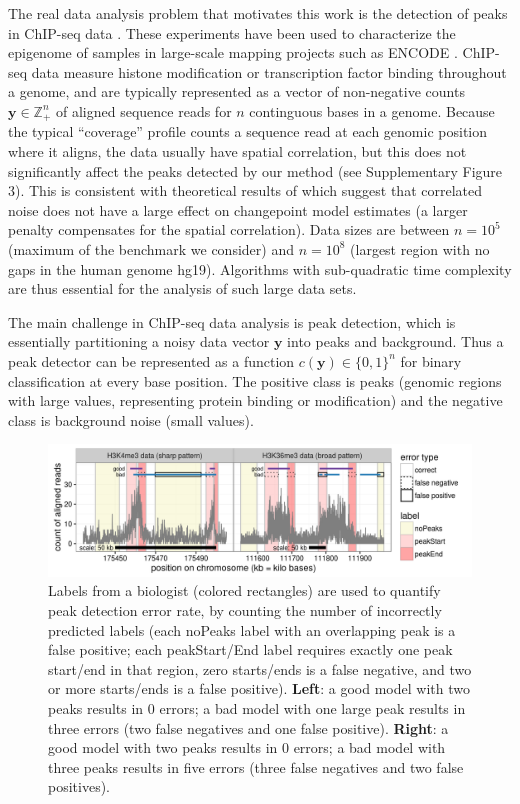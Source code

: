 \documentclass[aoas]{imsart}
\newcommand{\ZZ}{\mathbb Z}
\begin{document}
The real data analysis problem that motivates this work is the
detection of peaks in ChIP-seq data \citep{practical}. These
experiments have been used to characterize the epigenome of samples in
large-scale mapping projects such as ENCODE \citep{ENCODE}. ChIP-seq
data measure histone modification or transcription factor binding
throughout a genome, and are typically represented as a vector of
non-negative counts $\mathbf y\in\ZZ_+^n$ of aligned sequence reads
for $n$ continguous bases in a genome. Because the typical
``coverage'' profile counts a sequence read at each genomic position
where it aligns, the data usually have spatial correlation, but this
does not significantly affect the peaks detected by our method (see
Supplementary Figure 3). This is consistent with theoretical results
of \citet{Lavielle-Moulines} which suggest that correlated noise does
not have a large effect on changepoint model estimates (a larger
penalty compensates for the spatial correlation). Data sizes are
between $n=10^5$ (maximum of the benchmark we consider) and $n=10^8$
(largest region with no gaps in the human genome hg19). Algorithms
with sub-quadratic time complexity are thus essential for the analysis
of such large data sets.

The main challenge in ChIP-seq data analysis is peak detection, which
is essentially partitioning a noisy data vector $\mathbf y$ into peaks and
background. Thus a peak detector can be represented as a function
$c(\mathbf y)\in\{0,1\}^n$ for binary classification at every base
position. The positive class is peaks (genomic regions with large
values, representing protein binding or modification) and the negative
class is background noise (small values).

\begin{figure}[t!]
  \centering
  \includegraphics[width=\textwidth]{figure-good-bad}
\vskip -0.5cm
\caption{Labels from a biologist (colored rectangles) are used to 
  quantify peak detection error rate, by counting the
  number of incorrectly predicted labels
  (each noPeaks label with an overlapping
  peak is a false positive; each peakStart/End label requires exactly
  one peak start/end in that region, zero starts/ends is a false
  negative, and two or more starts/ends is a false positive).
  \textbf{Left}: a \textcolor{good}{good} model with two peaks results in 0 errors; a
  \textcolor{bad}{bad} model with one large peak results in three errors (two false negatives and one false positive).
  \textbf{Right}: a \textcolor{good}{good} model with two peaks results in 0 errors; a
  \textcolor{bad}{bad} model with three peaks results in five errors (three false negatives and two false positives).
}
  \label{fig:good-bad}
\end{figure}
\end{document}

